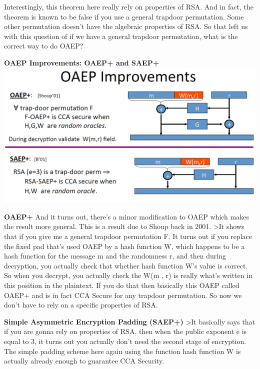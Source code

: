 \documentclass[11pt]{article}
\makeatletter
\def\maxwidth{\ifdim\Gin@nat@width>\linewidth\linewidth
    \else\Gin@nat@width\fi}
\let\Oldincludegraphics\includegraphics
\renewcommand{\includegraphics}[1]{\Oldincludegraphics[width=.8\maxwidth]{#1}}
\makeatother
\begin{document}
Interestingly, this theorem here really rely on properties of RSA. And
in fact, the theorem is known to be false if you use a general trapdoor
permutation. Some other permutation doesn't have the algebraic
properties of RSA. So that left us with this question of if we have a
general trapdoor permutation, what is the correct way to do OAEP?

\textbf{OAEP Improvements: OAEP+ and SAEP+}
\includegraphics{./Images/OAEP-Improvements.png}

\textbf{OAEP+} And it turns out, there's a minor modification to OAEP
which makes the result more general. This is a result due to Shoup back
in 2001. \textgreater{}It shows that if you give me a general trapdoor
permutation F. It turns out if you replace the fixed pad that's used
OAEP by a hash function W, which happens to be a hash function for the
message m and the randomness r, and then during decryption, you actually
check that whether hash function W's value is correct. So when you
decrypt, you actually check the W(m , r) is really what's written in
this position in the plaintext. If you do that then basically this OAEP
called OAEP+ and is in fact CCA Secure for any trapdoor permutation. So
now we don't have to rely on a specific properties of RSA.

\textbf{Simple Asymmetric Encryption Padding (SAEP+)} \textgreater{}It
basically says that if you are gonna rely on properties of RSA, then
when the public exponent e is equal to 3, it turns out you actually
don't need the second stage of encryption. The simple padding scheme
here again using the function hash function W is actually already enough
to guarantee CCA Security.
\end{document}
